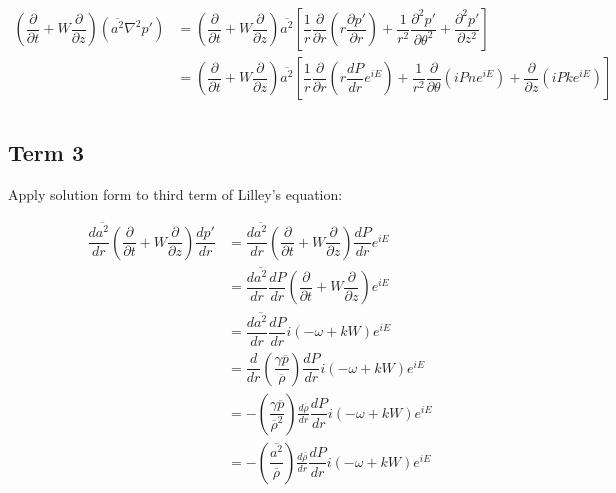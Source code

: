 \documentclass[]{aiaa-tc}%
\begin{document}
\begin{equation}
\begin{split}
\left( \dfrac{\partial}{\partial t} + W \dfrac{\partial}{\partial z} \right) (\overline{a^2}\nabla^2p')
&= \left( \dfrac{\partial}{\partial t} + W \dfrac{\partial}{\partial z}
   \right) \overline{a^2}
   \left[\dfrac{1}{r}\dfrac{\partial}{\partial r} \left( r\dfrac{\partial p'}{\partial r} \right)
      + \dfrac{1}{r^2} \dfrac{\partial^2 p'}{\partial \theta^2}
      + \dfrac{\partial^2 p'}{\partial z^2} \right] \\
&= \left( \dfrac{\partial}{\partial t} + W \dfrac{\partial}{\partial z}
   \right) \overline{a^2}
   \left[\dfrac{1}{r}\dfrac{\partial}{\partial r} \left( r \dfrac{dP}{dr} e^{iE} \right)
      + \dfrac{1}{r^2} \dfrac{\partial }{\partial \theta} \left( iPn e^{iE} \right)
      + \dfrac{\partial}{\partial z} \left( iPk e^{iE} \right) \right] \\
\end{split}
\end{equation}







\subsection{Term 3}

Apply solution form to third term of Lilley's equation:


\begin{equation}
\begin{split}
\dfrac{d \overline{a^2}}{dr} \left( \dfrac{\partial}{\partial t} + W \dfrac{\partial}{\partial z} \right) \dfrac{dp'}{dr}
&= \dfrac{d \overline{a^2}}{dr}
   \left( \dfrac{\partial}{\partial t} + W \dfrac{\partial}{\partial z} \right)
   \dfrac{dP}{dr} e^{iE}  \\
&= \dfrac{d \overline{a^2}}{dr} \dfrac{dP}{dr}
   \left( \dfrac{\partial}{\partial t} + W \dfrac{\partial}{\partial z} \right) e^{iE} \\
&= \dfrac{d \overline{a^2}}{dr} \dfrac{dP}{dr}
    i(-\omega + kW) e^{iE} \\
&= \dfrac{d}{dr} \left(\dfrac{\gamma \overline{p}}{\overline{\rho}}\right)
    \dfrac{dP}{dr} i(-\omega + kW) e^{iE} \\
&= -\left(\dfrac{\gamma \overline{p}}{\overline{\rho}^2}\right) \frac{d \overline{\rho}}{dr}
    \dfrac{dP}{dr} i(-\omega + kW) e^{iE} \\
&= -\left(\dfrac{\overline{a^2}}{\overline{\rho}}\right) \frac{d \overline{\rho}}{dr}
    \dfrac{dP}{dr} i(-\omega + kW) e^{iE} \\
\end{split}
\end{equation}
\end{document}

